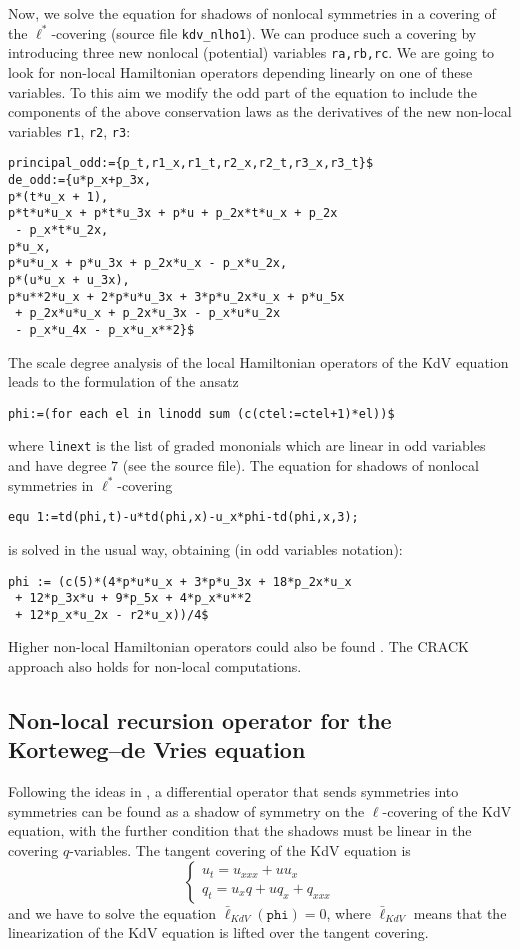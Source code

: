 Now, we solve the equation for shadows of nonlocal symmetries in a covering of
the $\ell^*$-covering (source file \texttt{kdv\_nlho1}). We can produce
such a covering by introducing three new nonlocal (potential) variables
\texttt{ra,rb,rc}. We are going to look for non-local Hamiltonian operators
depending linearly on one of these variables. To this aim we modify the odd
part of the equation to include the components of the above conservation laws
as the derivatives of the new non-local variables \texttt{r1}, \texttt{r2},
\texttt{r3}:
\begin{verbatim}
principal_odd:={p_t,r1_x,r1_t,r2_x,r2_t,r3_x,r3_t}$
de_odd:={u*p_x+p_3x,
p*(t*u_x + 1),
p*t*u*u_x + p*t*u_3x + p*u + p_2x*t*u_x + p_2x
 - p_x*t*u_2x,
p*u_x,
p*u*u_x + p*u_3x + p_2x*u_x - p_x*u_2x,
p*(u*u_x + u_3x),
p*u**2*u_x + 2*p*u*u_3x + 3*p*u_2x*u_x + p*u_5x
 + p_2x*u*u_x + p_2x*u_3x - p_x*u*u_2x
 - p_x*u_4x - p_x*u_x**2}$
\end{verbatim}
The scale degree analysis of the local Hamiltonian operators of the KdV
equation leads to the formulation of the ansatz
\begin{verbatim}
phi:=(for each el in linodd sum (c(ctel:=ctel+1)*el))$
\end{verbatim}
where \texttt{linext} is the list of graded mononials which are linear in odd
variables and have degree $7$ (see the source file).
The equation for shadows of nonlocal symmetries in $\ell^*$-covering
\begin{verbatim}
equ 1:=td(phi,t)-u*td(phi,x)-u_x*phi-td(phi,x,3);
\end{verbatim}
is solved in the usual way, obtaining (in odd variables notation):
\begin{verbatim}
phi := (c(5)*(4*p*u*u_x + 3*p*u_3x + 18*p_2x*u_x
 + 12*p_3x*u + 9*p_5x + 4*p_x*u**2
 + 12*p_x*u_2x - r2*u_x))/4$
\end{verbatim}
Higher non-local Hamiltonian operators could also be found
\cite{KerstenKrasilshchikVerboretsky:2004}. The CRACK approach also holds for non-local computations.


\subsection{Non-local recursion operator for the
  Korteweg--de Vries equation}
\label{cdesec:korteweg-de-vries-2}

Following the ideas in \cite{KerstenKrasilshchikVerboretsky:2004}, a differential operator that sends
symmetries into symmetries can be found as a shadow of symmetry on the
$\ell$-covering of the KdV equation, with the further condition that the
shadows must be linear in the covering $q$-variables. The tangent covering of
the KdV equation is
\begin{displaymath}
  \left\{\begin{array}{l}
    u_t=u_{xxx}+uu_x\\
    q_t=u_xq + uq_x + q_{xxx}
  \end{array}\right.
\end{displaymath}
and we have to solve the equation $\bar\ell_{KdV}(\mathtt{phi})=0$, where
$\bar\ell_{KdV}$ means that the linearization of the KdV equation is lifted
over the tangent covering.

